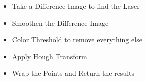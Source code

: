 \begin{itemize}
	\item Take a Difference Image to find the Laser
  \item Smoothen the Difference Image
  \item Color Threshold to remove everything else
  \item Apply Hough Transform
  \item Wrap the Points and Return the results
\end{itemize}